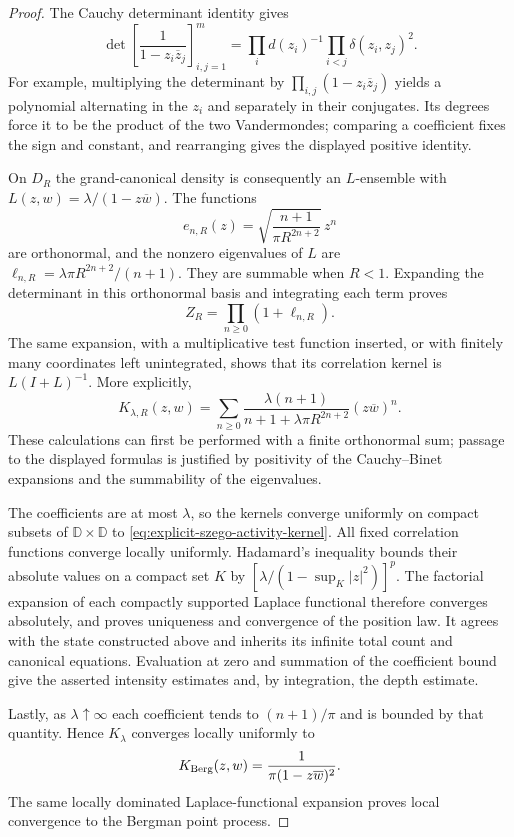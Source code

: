 \documentclass[11pt,a4paper]{article}
\numberwithin{equation}{section}
\theoremstyle{definition}
\theoremstyle{remark}
\newcommand{\D}{\mathbb D}
\begin{document}
\begin{proof}
The Cauchy determinant identity gives
\begin{equation}\label{eq:szego-cauchy-grand-identity}
 \det\left[\frac1{1-z_i\overline z_j}\right]_{i,j=1}^m
 =\prod_i d(z_i)^{-1}\prod_{i<j}\delta(z_i,z_j)^2.
\end{equation}
For example, multiplying the determinant by
$\prod_{i,j}(1-z_i\overline z_j)$ yields a polynomial alternating in
the $z_i$ and separately in their conjugates.  Its degrees force it to
be the product of the two Vandermondes; comparing a coefficient fixes
the sign and constant, and rearranging gives the displayed positive
identity.

On $D_R$ the grand-canonical density is consequently an $L$-ensemble
with $L(z,w)=\lambda/(1-z\overline w)$.  The functions
\[
 e_{n,R}(z)=\sqrt{\frac{n+1}{\pi R^{2n+2}}}\,z^n
\]
are orthonormal, and the nonzero eigenvalues of $L$ are
$\ell_{n,R}=\lambda\pi R^{2n+2}/(n+1)$.  They are summable when
$R<1$.  Expanding the determinant in this orthonormal basis and
integrating each term proves
\[
 Z_R=\prod_{n\ge0}(1+\ell_{n,R}).
\]
The same expansion, with a multiplicative test function inserted, or
with finitely many coordinates left unintegrated, shows that its
correlation kernel is $L(I+L)^{-1}$.  More explicitly,
\[
 K_{\lambda,R}(z,w)
 =\sum_{n\ge0}
       \frac{\lambda(n+1)}{n+1+\lambda\pi R^{2n+2}}
                       (z\overline w)^n.
\]
These calculations can first be performed with a finite orthonormal
sum; passage to the displayed formulas is justified by positivity of
the Cauchy--Binet expansions and the summability of the eigenvalues.

The coefficients are at most $\lambda$, so the kernels converge
uniformly on compact subsets of $\D\times\D$ to
\eqref{eq:explicit-szego-activity-kernel}.  All fixed correlation
functions converge locally uniformly.  Hadamard's inequality bounds
their absolute values on a compact set $K$ by
$[\lambda/(1-\sup_K|z|^2)]^p$.
The factorial expansion of each compactly supported Laplace functional
therefore converges absolutely, and proves uniqueness and convergence
of the position law.  It agrees with the state constructed above and
inherits its infinite total count and canonical equations.  Evaluation
at zero and summation of the coefficient bound give the asserted
intensity estimates and, by integration, the depth estimate.

Lastly, as $\lambda\uparrow\infty$ each coefficient tends to
$(n+1)/\pi$ and is bounded by that quantity.  Hence $K_\lambda$
converges locally uniformly to
\[
 K_{\rm Berg}(z,w)=\frac1{\pi(1-z\overline w)^2}.
\]
The same locally dominated Laplace-functional expansion proves local
convergence to the Bergman point process.
\end{proof}
\end{document}

